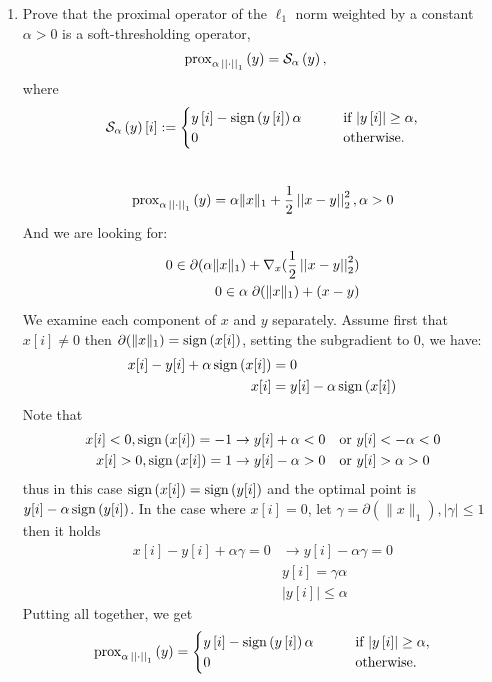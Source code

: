 \documentclass[12pt,twoside]{article}
\begin{document}
\begin{enumerate}
\begin{enumerate}
  \item Prove that the proximal operator of the $\ell_1$ norm weighted by a constant $\alpha > 0$ is a soft-thresholding operator,
\begin{align}
\operatorname{prox}_{\alpha \, \left|\left|  \cdot  \right|\right| _{1}}\left(  y  \right) & = \mathcal{ S }_{\alpha}\left( y \right),
\end{align}
where 
\begin{align}
\mathcal{ S }_{\alpha}\left( y \right)[i] := 
\begin{cases}
y\,[i] - \operatorname{sign}\left( y\,[i] \right) \alpha  \qquad & \text{if $\lvert y\,[i]\rvert \geq \alpha$}, \\
0 \quad & \text{otherwise}.
\end{cases}
\end{align}\\

$$
\operatorname{prox}_{\alpha \, \left|\left|  \cdot  \right|\right| _{1}}\left(  y  \right) = \alpha \|x\|_1 + \frac{1}{2} \left|\left| x-y \right|\right| _{2}^2, \alpha > 0
$$
And we are looking for:
\begin{align*}
	0 \in \partial( \alpha \|x\|_1) + \nabla_x (\frac{1}{2} \left|\left| x-y \right|\right| _{2}^2) \\
	0 \in \alpha \; \partial( \|x\|_1) + (x-y) \\
\end{align*}
We examine each component of $x$ and $y$ separately.
Assume first that $x[i] \neq 0$ then $ \partial( \|x\|_1) = \operatorname{sign}\left( x[i] \right)$, setting the subgradient to $0$, we have:
\begin{align*}
	x[i] - y[i] + \alpha \operatorname{sign}\left( x[i] \right)	&= 0 \\
	x[i]					&= y[i] - \alpha \operatorname{sign}\left( x[i] \right) \\
\end{align*}
Note that
\begin{align*}
	x[i] < 0, \operatorname{sign}\left( x[i] \right) = -1 &\rightarrow y[i] + \alpha < 0 \text{ ~ or }  y[i] < -\alpha < 0 \\
	x[i] > 0, \operatorname{sign}\left( x[i] \right) = 1 &\rightarrow y[i] - \alpha > 0 \text{ ~ or }  y[i] > \alpha > 0 \\
\end{align*}
thus in this case $\operatorname{sign}\left( x[i] \right) = \operatorname{sign}\left( y[i] \right)$ and the optimal point is $y[i] - \alpha \operatorname{sign}\left( y[i] \right)$.
In the case where $x[i]=0$, let $\gamma =  \partial(\|x\|_1), | \gamma | \le 1$ then it holds
\begin{align*}
	x[i] - y[i] + \alpha \gamma = 0 &\rightarrow y[i] - \alpha \gamma = 0 \\
							&	y[i] = \gamma \alpha \\
							& |y[i]| \le \alpha
\end{align*}
Putting all together, we get
\begin{align}
\operatorname{prox}_{\alpha \, \left|\left|  \cdot  \right|\right| _{1}}\left(  y  \right) = 
\begin{cases}
y\,[i] - \operatorname{sign}\left( y\,[i] \right) \alpha  \qquad & \text{if $\lvert y\,[i]\rvert \geq \alpha$}, \\
0 \quad & \text{otherwise}.
\end{cases}
\end{align}


\end{enumerate}
\end{enumerate}
\end{document}
